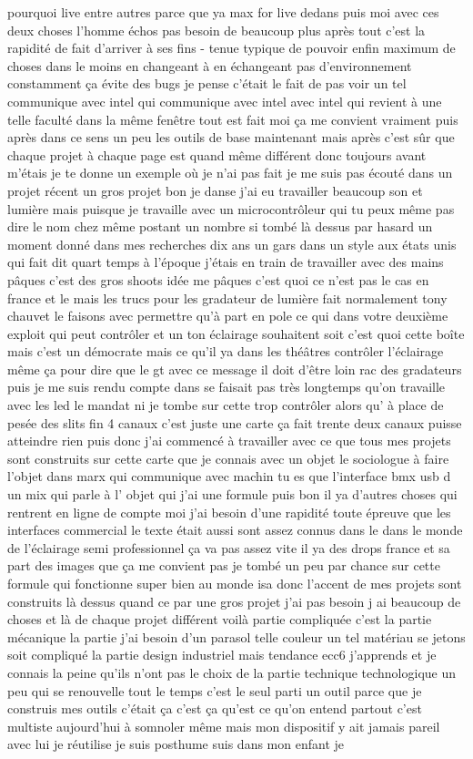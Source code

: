 pourquoi live entre autres parce que ya max for live dedans puis moi avec ces deux choses l'homme échos pas besoin de beaucoup plus après tout c'est la rapidité de fait d'arriver à ses fins - tenue typique de pouvoir enfin maximum de choses dans le moins en changeant à en échangeant pas d'environnement constamment ça évite des bugs je pense c'était le fait de pas voir un tel communique avec intel qui communique avec intel avec intel qui revient à une telle faculté dans la même fenêtre tout est fait moi ça me convient vraiment puis après dans ce sens un peu les outils de base maintenant mais après c'est sûr que chaque projet à chaque page est quand même différent donc toujours avant m'étais je te donne un exemple où je n'ai pas fait je me suis pas écouté dans un projet récent un gros projet bon je danse j'ai eu travailler beaucoup son et lumière mais puisque je travaille avec un microcontrôleur qui tu peux même pas dire le nom chez même postant un nombre si tombé là dessus par hasard un moment donné dans mes recherches dix ans un gars dans un style aux états unis qui fait dit quart temps à l'époque j'étais en train de travailler avec des mains pâques c'est des gros shoots idée me pâques c'est quoi ce n'est pas le cas en france et le mais les trucs pour les gradateur de lumière fait normalement tony chauvet le faisons avec permettre qu'à part en pole ce qui dans votre deuxième exploit qui peut contrôler et un ton éclairage souhaitent soit c'est quoi cette boîte mais c'est un démocrate mais ce qu'il ya dans les théâtres contrôler l'éclairage même ça pour dire que le gt avec ce message il doit d'être loin rac des gradateurs puis je me suis rendu compte dans se faisait pas très longtemps qu'on travaille avec les led le mandat ni je tombe sur cette trop contrôler alors qu' à place de pesée des slits fin 4 canaux c'est juste une carte ça fait trente deux canaux puisse atteindre rien puis donc j'ai commencé à travailler avec ce que tous mes projets sont construits sur cette carte que je connais avec un objet le sociologue à faire l'objet dans marx qui communique avec machin tu es que l'interface bmx usb d un mix qui parle à l' objet qui j'ai une formule puis bon il ya d'autres choses qui rentrent en ligne de compte moi j'ai besoin d'une rapidité toute épreuve que les interfaces commercial le texte était aussi sont assez connus dans le dans le monde de l'éclairage semi professionnel ça va pas assez vite il ya des drops france et sa part des images que ça me convient pas je tombé un peu par chance sur cette formule qui fonctionne super bien au monde isa donc l'accent de mes projets sont construits là dessus quand ce par une gros projet j'ai pas besoin j ai beaucoup de choses et là de chaque projet différent voilà partie compliquée c'est la partie mécanique la partie j'ai besoin d'un parasol telle couleur un tel matériau se jetons soit compliqué la partie design industriel mais tendance ecc6 j'apprends et je connais la peine qu'ils n'ont pas le choix de la partie technique technologique un peu qui se renouvelle tout le temps c'est le seul parti un outil parce que je construis mes outils c'était ça c'est ça qu'est ce qu'on entend partout c'est multiste aujourd'hui à somnoler même mais mon dispositif y ait jamais pareil avec lui je réutilise je suis posthume suis dans mon enfant je 